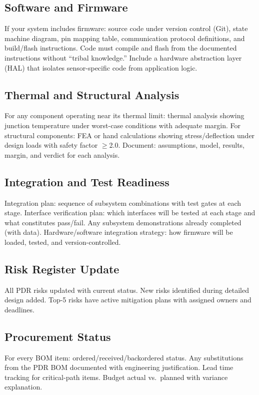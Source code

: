 \subsection{Software and Firmware}
If your system includes firmware: source code under version control (Git), state machine diagram, pin mapping table, communication protocol definitions, and build/flash instructions. Code must compile and flash from the documented instructions without ``tribal knowledge.'' Include a hardware abstraction layer (HAL) that isolates sensor-specific code from application logic.

\subsection{Thermal and Structural Analysis}
For any component operating near its thermal limit: thermal analysis showing junction temperature under worst-case conditions with adequate margin. For structural components: FEA or hand calculations showing stress/deflection under design loads with safety factor $\geq$2.0. Document: assumptions, model, results, margin, and verdict for each analysis.

\subsection{Integration and Test Readiness}
Integration plan: sequence of subsystem combinations with test gates at each stage. Interface verification plan: which interfaces will be tested at each stage and what constitutes pass/fail. Any subsystem demonstrations already completed (with data). Hardware/software integration strategy: how firmware will be loaded, tested, and version-controlled.

\subsection{Risk Register Update}
All PDR risks updated with current status. New risks identified during detailed design added. Top-5 risks have active mitigation plans with assigned owners and deadlines.

\subsection{Procurement Status}
For every BOM item: ordered/received/backordered status. Any substitutions from the PDR BOM documented with engineering justification. Lead time tracking for critical-path items. Budget actual vs.\ planned with variance explanation.


